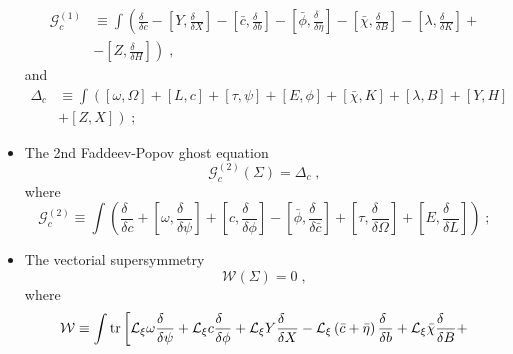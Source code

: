 \documentclass[../main.tex]{subfiles}
\begin{document}
\begin{itemize}
\begin{align}
          \label{eq:1stfpghostop}
          \mathcal{G}^{\left(1\right)}_c & \equiv \int \left(\frac{\delta\phantom{c}}{\delta c}-\left[Y,\frac{\delta\phantom{X}}{\delta X}\right]-\left[\bar{c},\frac{\delta\phantom{b}}{\delta b}\right]-\left[\bar{\phi},\frac{\delta\phantom{\bar{\eta}}}{\delta\bar{\eta}}\right]-\left[\bar{\chi},\frac{\delta\phantom{B}}{\delta B}\right]-\left[\lambda,\frac{\delta\phantom{K}}{\delta K}\right] + \right. \nonumber \\
                                         & \left. - \left[Z,\frac{\delta\phantom{H}}{\delta H}\right]\right) \;,
        \end{align}
        and
        \begin{align}
          \label{eq:linearbreakc}
          \Delta_c & \equiv \int \left(\left[\omega ,\Omega\right]+\left[L,c\right]+\left[\tau,\psi\right]+\left[E,\phi\right]+\left[\bar{\chi},K\right]+\left[\lambda,B\right] + \left[Y,H\right] \right. \nonumber \\
                   & + \left. \left[Z,X\right] \right) \;;
        \end{align}
  \item The 2nd Faddeev-Popov ghost equation
        \begin{equation}
          \label{eq:2ndfpghosteq}
          \mathcal{G}^{\left(2\right)}_c \left(\Sigma\right)=\Delta_c \;,
        \end{equation}
        where
        \begin{equation}
          \label{eq:2ndfpghostop}
          \mathcal{G}^{\left(2\right)}_c \equiv \int \left(\frac{\delta\phantom{c}}{\delta c}+\left[\omega ,\frac{\delta\phantom{\psi}}{\delta \psi}\right]+\left[c,\frac{\delta\phantom{\phi}}{\delta \phi}\right]-\left[\bar{\phi},\frac{\delta\phantom{\bar{c}}}{\delta\bar{c}}\right]+\left[\tau,\frac{\delta\phantom{\Omega}}{\delta \Omega}\right]+\left[E,\frac{\delta\phantom{L}}{\delta L}\right]\right)\;;
        \end{equation}
  \item  The vectorial supersymmetry
        \begin{equation}
          \label{eq:vecsusyeq}
          \mathcal{W}\left(\Sigma\right)=0 \;,
        \end{equation}
        where
        \begin{align}
          \label{eq:vecsusyop}
          \mathcal{W} & \equiv \int \tr \left[\mathcal{L}_\xi \omega \frac{\delta\phantom{\psi}}{\delta\psi}+\mathcal{L}_\xi c\frac{\delta\phantom{\phi}}{\delta\phi}+\mathcal{L}_\xi Y \frac{\delta\phantom{X}}{\delta X}-\mathcal{L}_\xi\left(\bar{c}+\bar{\eta}\right)\frac{\delta\phantom{b}}{\delta b}+\mathcal{L}_\xi \bar{\chi}\frac{\delta\phantom{B}}{\delta B}+ \right. \nonumber \\

\end{align}
\end{itemize}
\end{document}
